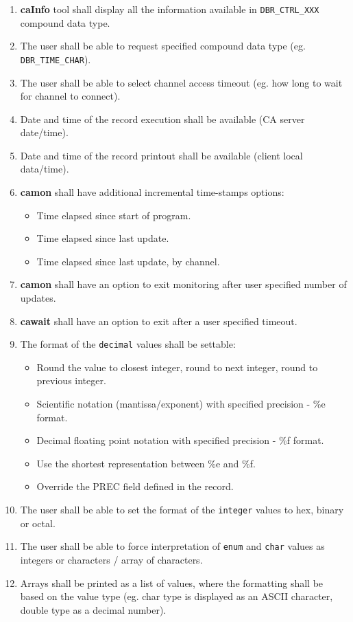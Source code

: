 \documentclass[12pt,a4paper]{article}
\begin{document}
\begin{enumerate}
	\item \textbf{caInfo} tool shall display all the information available in \texttt{DBR\_CTRL\_XXX} compound data type.
	\item The user shall be able to request specified compound data type (eg. \texttt{DBR\_TIME\_CHAR}).
	\item The user shall be able to select channel access timeout (eg. how long to wait for channel to connect).
	\item Date and time of the record execution shall be available (CA server date/time).
	\item Date and time of the record printout shall be available (client local data/time).
	\item \textbf{camon} shall have additional incremental time-stamps options:
	\begin{itemize}
		\item Time elapsed since start of program.
		\item Time elapsed since last update.
		\item Time elapsed since last update, by channel.
	\end{itemize}
	\item \textbf{camon} shall have an option to exit monitoring after user specified number of updates.
	\item \textbf{cawait} shall have an option to exit after a user specified timeout.
	\item The format of the \texttt{decimal} values shall be settable:
	\begin{itemize}
		\item Round the value to closest integer, round to next integer, round to previous integer.
		\item Scientific notation (mantissa/exponent) with specified precision - \%e format.
		\item Decimal floating point notation with specified precision - \%f format.
		\item Use the shortest representation between \%e and \%f.
		\item Override the PREC field defined in the record.
	\end{itemize}
	\item The user shall be able to set the format of the \texttt{integer} values to hex, binary or octal.
	\item The user shall be able to force interpretation of \texttt{enum} and \texttt{char} values as integers or characters / array of characters.
	\item Arrays shall be printed as a list of values, where the formatting shall be based on the value type (eg. char type is displayed as an ASCII character, double type as a decimal number).

\end{enumerate}
\end{document}
